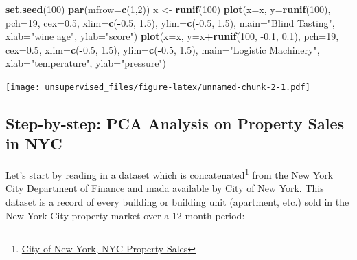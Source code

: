 \documentclass[]{article}
\newenvironment{Shaded}{\begin{snugshade}}{\end{snugshade}}
\newcommand{\DataTypeTok}[1]{\textcolor[rgb]{0.13,0.29,0.53}{#1}}
\newcommand{\DecValTok}[1]{\textcolor[rgb]{0.00,0.00,0.81}{#1}}
\newcommand{\FloatTok}[1]{\textcolor[rgb]{0.00,0.00,0.81}{#1}}
\newcommand{\KeywordTok}[1]{\textcolor[rgb]{0.13,0.29,0.53}{\textbf{#1}}}
\newcommand{\NormalTok}[1]{#1}
\newcommand{\OperatorTok}[1]{\textcolor[rgb]{0.81,0.36,0.00}{\textbf{#1}}}
\newcommand{\StringTok}[1]{\textcolor[rgb]{0.31,0.60,0.02}{#1}}
\begin{document}
\begin{Shaded}
\begin{Highlighting}[]
\KeywordTok{set.seed}\NormalTok{(}\DecValTok{100}\NormalTok{)}
\KeywordTok{par}\NormalTok{(}\DataTypeTok{mfrow=}\KeywordTok{c}\NormalTok{(}\DecValTok{1}\NormalTok{,}\DecValTok{2}\NormalTok{))}
\NormalTok{x <-}\StringTok{ }\KeywordTok{runif}\NormalTok{(}\DecValTok{100}\NormalTok{)}
\KeywordTok{plot}\NormalTok{(}\DataTypeTok{x=}\NormalTok{x, }\DataTypeTok{y=}\KeywordTok{runif}\NormalTok{(}\DecValTok{100}\NormalTok{), }\DataTypeTok{pch=}\DecValTok{19}\NormalTok{, }\DataTypeTok{cex=}\FloatTok{0.5}\NormalTok{, }\DataTypeTok{xlim=}\KeywordTok{c}\NormalTok{(}\OperatorTok{-}\FloatTok{0.5}\NormalTok{, }\FloatTok{1.5}\NormalTok{), }\DataTypeTok{ylim=}\KeywordTok{c}\NormalTok{(}\OperatorTok{-}\FloatTok{0.5}\NormalTok{, }\FloatTok{1.5}\NormalTok{), }\DataTypeTok{main=}\StringTok{"Blind Tasting"}\NormalTok{, }\DataTypeTok{xlab=}\StringTok{"wine age"}\NormalTok{, }\DataTypeTok{ylab=}\StringTok{"score"}\NormalTok{)}
\KeywordTok{plot}\NormalTok{(}\DataTypeTok{x=}\NormalTok{x, }\DataTypeTok{y=}\NormalTok{x}\OperatorTok{+}\KeywordTok{runif}\NormalTok{(}\DecValTok{100}\NormalTok{, }\FloatTok{-0.1}\NormalTok{, }\FloatTok{0.1}\NormalTok{), }\DataTypeTok{pch=}\DecValTok{19}\NormalTok{, }\DataTypeTok{cex=}\FloatTok{0.5}\NormalTok{, }\DataTypeTok{xlim=}\KeywordTok{c}\NormalTok{(}\OperatorTok{-}\FloatTok{0.5}\NormalTok{, }\FloatTok{1.5}\NormalTok{), }\DataTypeTok{ylim=}\KeywordTok{c}\NormalTok{(}\OperatorTok{-}\FloatTok{0.5}\NormalTok{, }\FloatTok{1.5}\NormalTok{), }\DataTypeTok{main=}\StringTok{"Logistic Machinery"}\NormalTok{, }\DataTypeTok{xlab=}\StringTok{"temperature"}\NormalTok{, }\DataTypeTok{ylab=}\StringTok{"pressure"}\NormalTok{)}
\end{Highlighting}
\end{Shaded}

\texttt{[image: unsupervised\_files/figure-latex/unnamed-chunk-2-1.pdf]}

\hypertarget{step-by-step-pca-analysis-on-property-sales-in-nyc}{%
\subsection{Step-by-step: PCA Analysis on Property Sales in
NYC}\label{step-by-step-pca-analysis-on-property-sales-in-nyc}}

Let's start by reading in a dataset which is concatenated\footnote{\href{https://www.kaggle.com/new-york-city/nyc-property-sales}{City
  of New York, NYC Property Sales}} from the New York City Department of
Finance and mada available by City of New York. This dataset is a record
of every building or building unit (apartment, etc.) sold in the New
York City property market over a 12-month period:
\end{document}
